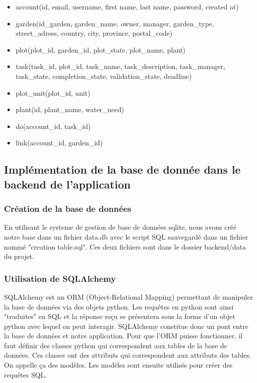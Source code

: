\documentclass[french,a4paper]{article}
\begin{document}
\begin{itemize}
    \item account(id, email, username, first name, last name, password, created at)
    \item garden(id\_garden, garden\_name, owner, manager, garden\_type, street\_adress, country, city, province, postal\_code)
    \item plot(plot\_id, garden\_id, plot\_state, plot\_name, plant)
    \item task(task\_id, plot\_id, task\_name, task\_description, task\_manager, task\_state, completion\_state, validation\_state, deadline)
    \item plot\_unit(plot\_id, unit)
    \item plant(id, plant\_name, water\_need)
    \item do(account\_id, task\_id)
    \item link(account\_id, garden\_id)
\end{itemize}
\subsection{Implémentation de la base de donnée dans le backend de l'application}

\subsubsection{Création de la base de données}
En utilisant le systeme de gestion de base de données sqlite, nous avons créé notre base dans un fichier data.db avec le script 
SQL sauvegardé dans un fichier nommé "creation table.sql". Ces deux fichiers sont dans le dossier backend/data du projet. 


\subsubsection{Utilisation de SQLAlchemy}
SQLAlchemy est un ORM (Object-Relational Mapping) permettant de manipuler la base de données via des objets python. Les requêtes en 
python sont ainsi "traduites" en SQL et la réponse reçu se présentera sous la forme d’un objet python avec lequel on peut interagir.
SQLAlchemy constitue donc un pont entre la base de données et notre application. Pour que l’ORM puisse fonctionner, il faut définir
des classes python qui correspondent aux tables de la base de données. Ces classes ont des attributs qui correspondent aux attributs 
des tables. On appelle ça des modèles. Les modèles sont ensuite utilisés pour créer des requêtes SQL.
\end{document}
